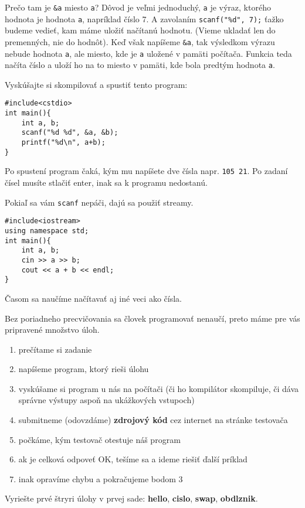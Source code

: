 Prečo tam je \verb!&a! miesto \verb!a!? Dôvod je veľmi jednoduchý, \verb!a! je
výraz, ktorého hodnota je hodnota \verb!a!, napríklad číslo 7. A zavolaním
\verb!scanf("%d", 7);! ťažko budeme vedieť, kam máme uložiť načítanú hodnotu.
(Vieme ukladať len do premenných, nie do hodnôt). Keď však napíšeme \verb!&a!,
tak výsledkom výrazu nebude hodnota \verb!a!, ale miesto, kde je \verb!a!
uložené v pamäti počítača.  Funkcia teda načíta číslo a uloží ho na to miesto v
pamäti, kde bola predtým hodnota \verb!a!.

Vyskúšajte si skompilovať a spustiť tento program:
\begin{lstlisting}
#include<cstdio>
int main(){
    int a, b;
    scanf("%d %d", &a, &b);
    printf("%d\n", a+b);
}
\end{lstlisting}

Po spustení program čaká, kým mu napíšete dve čísla napr. \verb"105 21". Po
zadaní čísel musíte stlačiť enter, inak sa k programu nedostanú. 

Pokiaľ sa vám \verb!scanf! nepáči, dajú sa použiť streamy.
\begin{lstlisting}
#include<iostream>
using namespace std;
int main(){
    int a, b;
    cin >> a >> b;
    cout << a + b << endl;
}
\end{lstlisting}

Časom sa naučíme načítavať aj iné veci ako čísla.


Bez poriadneho precvičovania sa človek programovať nenaučí, preto máme pre vás
pripravené množstvo úloh. 

\begin{enumerate}
    \vspace{-8pt}
    \item prečítame si zadanie
    \vspace{-5pt}
    \item napíšeme program, ktorý rieši úlohu
    \vspace{-5pt}
    \item vyskúšame si program u nás na počítači (či ho kompilátor
    skompiluje, či dáva správne výstupy aspoň na ukážkových vstupoch)
    \vspace{-5pt}
    \item submitneme (odovzdáme) \textbf{zdrojový kód} cez internet na stránke testovača
    \vspace{-5pt}
    \item počkáme, kým testovač otestuje náš program
    \vspace{-5pt}
    \item ak je celková odpoveť OK, tešíme sa a ideme riešiť ďalší príklad
    \vspace{-5pt}
    \item inak opravíme chybu a pokračujeme bodom 3
\end{enumerate}

\medskip

Vyriešte prvé štryri úlohy v prvej sade: \textbf{hello}, \textbf{cislo}, 
\textbf{swap}, \textbf{obdlznik}.





